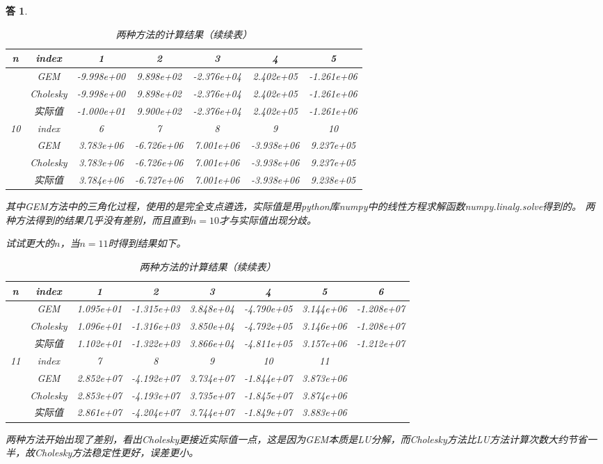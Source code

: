 \documentclass[10pt]{ctexart}
\newtheorem*{answer}{答}
\begin{document}
\begin{answer}
\begin{table}[H]
        \centering
        \begin{tabular}{ccccccc}
            \toprule
            n & index & 1 & 2 & 3 & 4 & 5\\
            \midrule
            & GEM & -9.998e+00 & 9.898e+02 & -2.376e+04 & 2.402e+05 & -1.261e+06\\
            & Cholesky & -9.998e+00 & 9.898e+02 & -2.376e+04 & 2.402e+05 & -1.261e+06\\
            & 实际值 & -1.000e+01 & 9.900e+02 & -2.376e+04 & 2.402e+05 & -1.261e+06\\
            \cmidrule{2-7}
            10 & index & 6 & 7 & 8 & 9 & 10\\
            \cmidrule{2-7}
            & GEM & 3.783e+06 & -6.726e+06 & 7.001e+06 & -3.938e+06 & 9.237e+05\\
            & Cholesky & 3.783e+06 & -6.726e+06 & 7.001e+06 & -3.938e+06 & 9.237e+05\\
            & 实际值 & 3.784e+06 & -6.727e+06 & 7.001e+06 & -3.938e+06 & 9.238e+05\\
            \bottomrule
        \end{tabular}
        \caption{两种方法的计算结果（续续表）}
    \end{table}
    其中GEM方法中的三角化过程，使用的是完全支点遴选，实际值是用python库numpy中的线性方程求解函数numpy.linalg.solve得到的。
    两种方法得到的结果几乎没有差别，而且直到$n=10$才与实际值出现分歧。

    试试更大的$n$，当$n=11$时得到结果如下。\\
    \begin{table}[H]
        \centering
        \begin{tabular}{cccccccc}
            \toprule
            n & index & 1 & 2 & 3 & 4 & 5 & 6 \\
            \midrule
            & GEM & 1.095e+01 & -1.315e+03 & 3.848e+04 & -4.790e+05 & 3.144e+06 & -1.208e+07\\
            & Cholesky & 1.096e+01 & -1.316e+03 & 3.850e+04 & -4.792e+05 & 3.146e+06 & -1.208e+07\\
            & 实际值 & 1.102e+01 & -1.322e+03 & 3.866e+04 & -4.811e+05 & 3.157e+06 & -1.212e+07\\
            \cmidrule{2-8}
            11 & index & 7 & 8 & 9 & 10 & 11 \\
            \cmidrule{2-8}
            & GEM & 2.852e+07 & -4.192e+07 & 3.734e+07 & -1.844e+07 &  3.873e+06\\
            & Cholesky & 2.853e+07 & -4.193e+07 & 3.735e+07 & -1.845e+07 & 3.874e+06\\
            & 实际值 & 2.861e+07 & -4.204e+07 & 3.744e+07 & -1.849e+07 & 3.883e+06\\
            \bottomrule
        \end{tabular}
        \caption{两种方法的计算结果（续续表）}
    \end{table}    
    两种方法开始出现了差别，看出Cholesky更接近实际值一点，这是因为GEM本质是LU分解，而Cholesky方法比LU方法计算次数大约节省一半，故Cholesky方法稳定性更好，误差更小。
\end{answer}
\end{document}
